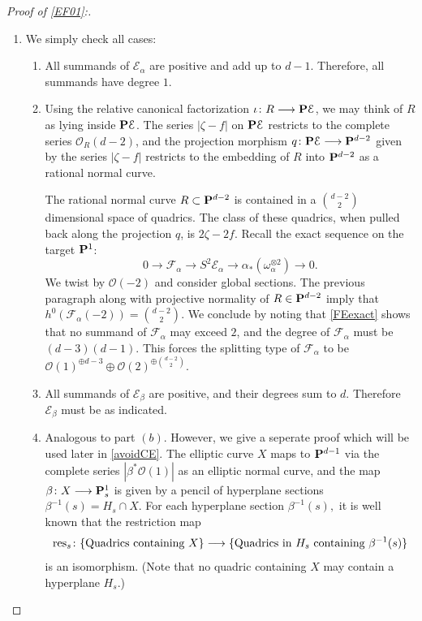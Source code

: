 \documentclass[reqno, 10 pt]{article}
\theoremstyle{definition}
\theoremstyle{remark}
\numberwithin{equation}{section}
\numberwithin{thm}{section}
\numberwithin{prop}{section}
\numberwithin{lem}{section}
\numberwithin{cor}{section}
\numberwithin{conj}{section}
\numberwithin{defn}{section}
\renewcommand{\to}{\longrightarrow}
\newcommand{\cE}{{\mathcal E}}
\newcommand{\cF}{{\mathcal F}}
\newcommand{\cO}{{\mathcal O}}
\renewcommand{\P}{{\bf P}}
\newcommand {\from}{{\colon}}
\newcommand {\res}{{\rm res}}
\begin{document}
\begin{proof}[Proof of \autoref{EF01}:] 
\begin{enumerate}
\item We simply check all cases:
\begin{enumerate}

\item All summands of $\cE_{\alpha}$ are positive and add up to $ d-1$.  Therefore, all summands have degree $1$.
\item Using the relative canonical factorization $\iota \from R \to \P \cE$, we may think of $R$ as lying inside $\P \cE$. The series $|\zeta - f|$ on $\P \cE$ restricts to the complete series $\cO_{R}(d-2)$, and the projection morphism $q \from \P \cE \to \P^{d-2}$ given by the series $|\zeta - f|$ restricts to the embedding of $R$ into $\P^{d-2}$ as a rational normal curve. 

The rational normal curve $R \subset \P^{d-2}$ is contained in a ${d-2 \choose 2}$ dimensional space of quadrics.  The class of these quadrics, when pulled back along the projection $q$, is $2\zeta - 2f$.  Recall the exact sequence on the target $\P^1$: 
\begin{equation}\label{FEexact}
0 \to \cF_{\alpha} \to S^{2}\cE_{\alpha} \to \alpha_{*}({\omega^{\otimes 2}_{\alpha}}) \to 0.
\end{equation}
We twist by $\cO(-2)$ and consider global sections.  The previous paragraph along with projective normality of $R \in \P^{d-2}$ imply that $h^{0}(\cF_{\alpha}(-2)) = {d-2 \choose 2}$.  We conclude by noting that \eqref{FEexact} shows that no summand of $\cF_{\alpha}$ may exceed $2$, and the degree of $\cF_{\alpha}$ must be $(d-3)(d-1)$.  This forces the splitting type of $\cF_{\alpha}$ to be $\cO(1)^{\oplus d-3} \oplus \cO(2)^{\oplus {d-2 \choose 2}}$.

\item All summands of $\cE_{\beta}$ are positive, and their degrees sum to $d$.  Therefore $\cE_{\beta}$ must be as indicated.

\item Analogous to part $(b)$. However, we give a seperate proof which will be used later in \autoref{avoidCE}. The elliptic curve $X$ maps to $\P^{d-1}$ via the complete series $|\beta^{*}\cO(1)|$ as an elliptic normal curve, and the map $\beta \from X \to \P^{1}_{s}$ is given by a pencil of hyperplane sections $\beta^{-1}(s) = H_{s} \cap X$. For each hyperplane section $\beta^{-1}(s),$  it is well known that the restriction map 
\begin{equation}\label{restrictionelliptic}
\res_{s} \from \{\text{Quadrics containing $X$}\} \to \{\text{Quadrics in $H_s$ containing $\beta^{-1}(s)$}  \}
\end{equation}
 is an isomorphism. (Note that no quadric containing $X$ may contain a hyperplane $H_{s}$.)


\end{enumerate}
\end{enumerate}
\end{proof}
\end{document}
